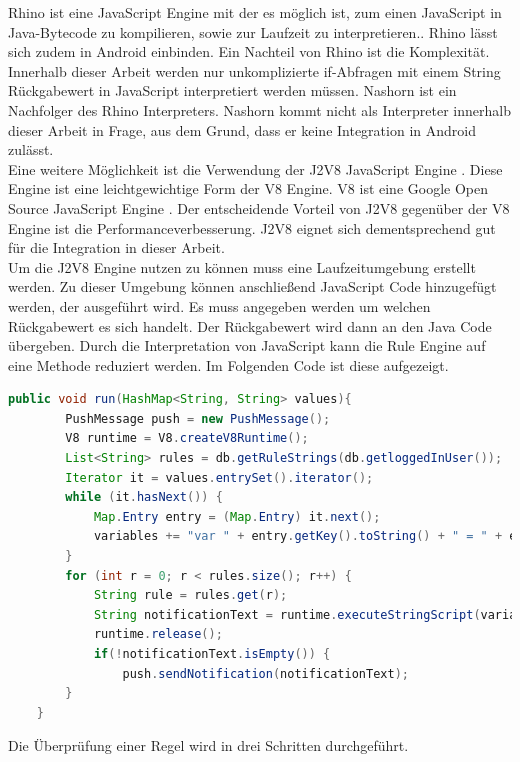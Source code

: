 Rhino ist eine JavaScript Engine mit der es möglich ist, zum einen JavaScript in Java-Bytecode zu kompilieren, sowie zur Laufzeit zu interpretieren.\cite{mozilla:rhino}. Rhino lässt sich zudem in Android einbinden. Ein Nachteil von Rhino ist die Komplexität. Innerhalb dieser Arbeit werden nur unkomplizierte if-Abfragen mit einem String Rückgabewert in JavaScript interpretiert werden müssen. Nashorn ist ein Nachfolger des Rhino Interpreters. Nashorn kommt nicht als Interpreter innerhalb dieser Arbeit in Frage, aus dem Grund, dass er keine Integration in Android zulässt.\\
Eine weitere Möglichkeit ist die Verwendung der J2V8 JavaScript Engine \cite{github:j2v8}. Diese Engine ist eine leichtgewichtige Form der V8 Engine. V8 ist eine Google Open Source JavaScript Engine \cite{github:v8}. Der entscheidende Vorteil von J2V8 gegenüber der V8 Engine ist die Performanceverbesserung. J2V8 eignet sich dementsprechend gut für die Integration in dieser Arbeit.\\
Um die J2V8 Engine nutzen zu können muss eine Laufzeitumgebung erstellt werden. Zu dieser Umgebung können anschließend JavaScript Code hinzugefügt werden, der ausgeführt wird. Es muss angegeben werden um welchen Rückgabewert es sich handelt. Der Rückgabewert wird dann an den Java Code übergeben. Durch die Interpretation von JavaScript kann die Rule Engine auf eine Methode reduziert werden. Im Folgenden Code ist diese aufgezeigt.
\begin{lstlisting}[language=java]
	public void run(HashMap<String, String> values){
		PushMessage push = new PushMessage();
    	V8 runtime = V8.createV8Runtime();
        List<String> rules = db.getRuleStrings(db.getloggedInUser());
        Iterator it = values.entrySet().iterator();
        while (it.hasNext()) {
            Map.Entry entry = (Map.Entry) it.next();
            variables += "var " + entry.getKey().toString() + " = " + entry.getValue() + ";";
        }
        for (int r = 0; r < rules.size(); r++) {
            String rule = rules.get(r);
            String notificationText = runtime.executeStringScript(variables + rule);
            runtime.release();
            if(!notificationText.isEmpty()) {
                push.sendNotification(notificationText);
        }
    }
\end{lstlisting}
Die Überprüfung einer Regel wird in drei Schritten durchgeführt.
